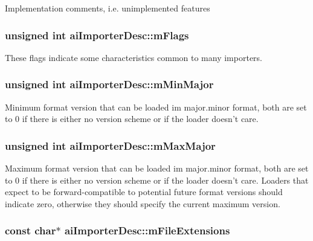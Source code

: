 Implementation comments, i.e. unimplemented features \hypertarget{structai_importer_desc_9939db58b9f95a537f9f5a749524b6b2}{
\subsubsection[mFlags]{\setlength{\rightskip}{0pt plus 5cm}unsigned int {\bf aiImporterDesc::mFlags}}}
\label{structai_importer_desc_9939db58b9f95a537f9f5a749524b6b2}


These flags indicate some characteristics common to many importers. \hypertarget{structai_importer_desc_ee34d348f522807f0a36607664e92a57}{
\subsubsection[mMinMajor]{\setlength{\rightskip}{0pt plus 5cm}unsigned int {\bf aiImporterDesc::mMinMajor}}}
\label{structai_importer_desc_ee34d348f522807f0a36607664e92a57}


Minimum format version that can be loaded im major.minor format, both are set to 0 if there is either no version scheme or if the loader doesn't care. \hypertarget{structai_importer_desc_9d33eac3be20f7f4630f838a228ada63}{
\subsubsection[mMaxMajor]{\setlength{\rightskip}{0pt plus 5cm}unsigned int {\bf aiImporterDesc::mMaxMajor}}}
\label{structai_importer_desc_9d33eac3be20f7f4630f838a228ada63}


Maximum format version that can be loaded im major.minor format, both are set to 0 if there is either no version scheme or if the loader doesn't care. Loaders that expect to be forward-compatible to potential future format versions should indicate zero, otherwise they should specify the current maximum version. \hypertarget{structai_importer_desc_074bd688ffd15d7f4df32e794111a413}{
\subsubsection[mFileExtensions]{\setlength{\rightskip}{0pt plus 5cm}const char$\ast$ {\bf aiImporterDesc::mFileExtensions}}}
\label{structai_importer_desc_074bd688ffd15d7f4df32e794111a413}


